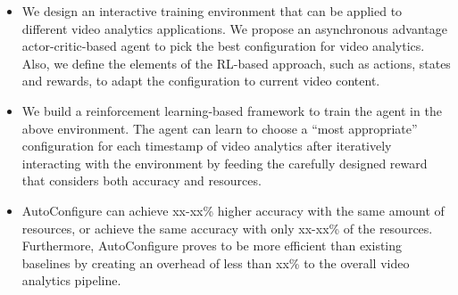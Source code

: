 \begin{itemize}	
\item We design an interactive training environment that can be applied to different video analytics applications. We propose an asynchronous advantage actor-critic-based \cite{mnih2016asynchronous} agent to pick the best configuration for video analytics. Also, we define the elements of the RL-based approach, such as actions, states and rewards, to adapt the configuration to current video content.

\item We build a reinforcement learning-based framework to train the agent in the above environment. The agent can learn to choose a ``most appropriate'' configuration for each timestamp of video analytics after iteratively interacting with the environment by feeding the carefully designed reward that considers both accuracy and resources.
 
\item AutoConfigure can achieve xx-xx\% higher accuracy with the
same amount of resources, or achieve the same accuracy
with only xx-xx\% of the resources. Furthermore, AutoConfigure proves to be more efficient than existing baselines by creating an overhead of less than xx\% to the overall video analytics pipeline.
\end{itemize}

